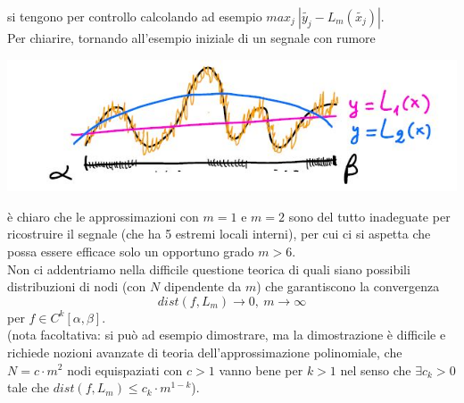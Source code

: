 si tengono per controllo calcolando ad esempio $max_j\  |\tilde{y_j}-L_m(\tilde{x_j})|$.\\Per chiarire, tornando all'esempio iniziale di un segnale con rumore
\begin{center}
    \includegraphics[scale=0.7]{foto/calcolo32}
\end{center}
è chiaro che le approssimazioni con $m=1$ e $m=2$ sono del tutto inadeguate per ricostruire il segnale (che ha 5 estremi locali interni), per cui ci si aspetta che possa essere efficace solo un opportuno grado $m>6$.\\
Non ci addentriamo nella difficile questione teorica di quali siano possibili distribuzioni di nodi (con $N$ dipendente da $m$) che garantiscono la convergenza 
\[
dist(f, L_m) \to 0, \ m \to \infty
\]
per $f \in C^k[\alpha, \beta]$.\\
(nota facoltativa: si può ad esempio dimostrare, ma la dimostrazione è difficile e richiede nozioni avanzate di teoria dell'approssimazione polinomiale, che $N = c \cdot m^2$ nodi equispaziati con $c>1$ vanno bene per $k>1$ nel senso che $\exists c_k > 0$ tale che $dist(f,L_m) \leq c_k \cdot m^{1-k}$).
\newpage